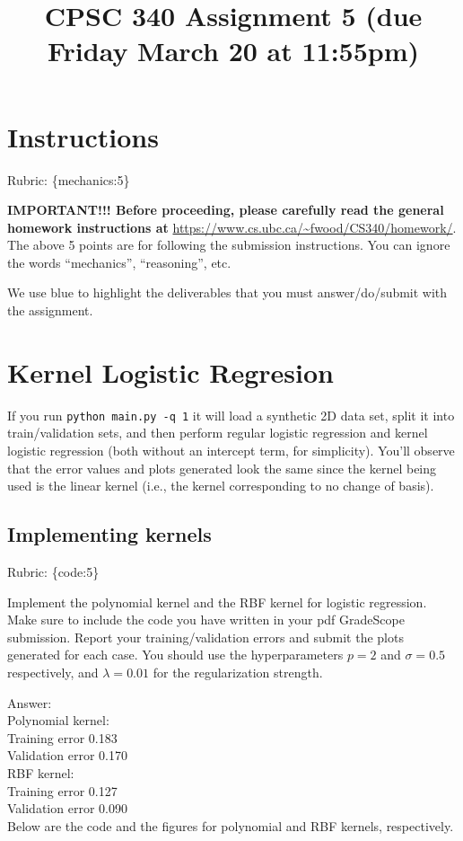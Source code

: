 \documentclass{article}
\def\rubric#1{\gre{Rubric: \{#1\}}}{}
\def\blu#1{{\color{blu}#1}}
\def\gre#1{{\color{gre}#1}}
\def\ans#1{\gre{Answer: #1}}{}
\begin{document}
\title{CPSC 340 Assignment 5 (due Friday March 20 at 11:55pm)}
\date{}
\maketitle

\vspace{-7em}


\section*{Instructions}
\rubric{mechanics:5}

\textbf{IMPORTANT!!! Before proceeding, please carefully read the general homework instructions at} \url{https://www.cs.ubc.ca/~fwood/CS340/homework/}. The above 5 points are for following the submission instructions. You can ignore the words ``mechanics'', ``reasoning'', etc.

\vspace{1em}
We use \blu{blue} to highlight the deliverables that you must answer/do/submit with the assignment.


\section{Kernel Logistic Regresion}

If you run \verb|python main.py -q 1| it will load a synthetic 2D data set, split it into train/validation sets, and then perform regular logistic regression and kernel logistic regression (both without an intercept term, for simplicity). You'll observe that the error values and plots generated look the same since the kernel being used is the linear kernel (i.e., the kernel corresponding to no change of basis).

\subsection{Implementing kernels}
\rubric{code:5}

 \blu{Implement the polynomial kernel and the RBF kernel for logistic regression. Make sure to include the code you have written in your pdf GradeScope submission. Report your training/validation errors and submit the plots generated for each case}. You should use the hyperparameters $p=2$ and $\sigma=0.5$ respectively, and $\lambda=0.01$ for the regularization strength.

\ans{ \\
	Polynomial kernel: \\
	Training error 0.183 \\
	Validation error 0.170 \\
	RBF kernel: \\
	Training error 0.127 \\
	Validation error 0.090 \\
	Below are the code and the figures for polynomial and RBF kernels, respectively.
}
\end{document}
